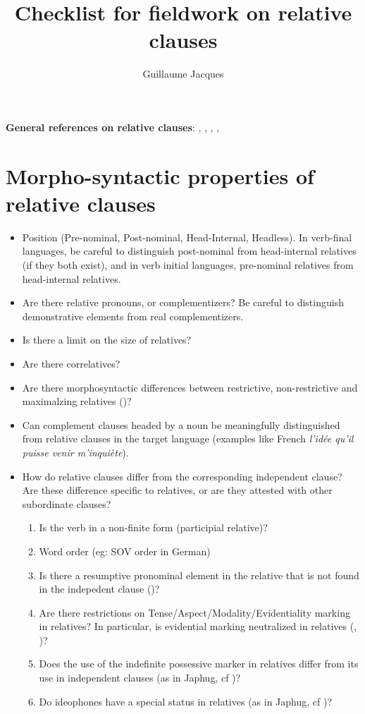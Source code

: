 \documentclass[oldfontcommands,oneside,a4paper,11pt]{article}
\begin{document}
 
\title{Checklist for fieldwork on relative clauses}
\author{Guillaume Jacques}
\maketitle

\textbf{General references on relative clauses}: \citet{comrie81relative}, \citet{lehmann86relatives}, \citet[205-250]{creissels06sgit2}, \citet{andrews07relatives}, \citet[313-369]{dixon10basic2}

\section{Morpho-syntactic properties of relative clauses}




\begin{itemize}
\item Position (Pre-nominal, Post-nominal, Head-Internal, Headless). In verb-final languages, be careful to distinguish post-nominal from head-internal relatives (if they both exist), and in verb initial languages, pre-nominal relatives from head-internal relatives.
\item Are there relative pronouns, or complementizers? Be careful to distinguish demonstrative elements from real complementizers.
\item Is there a limit on the size of relatives?
\item Are there correlatives?
\item Are there morphosyntactic differences between restrictive, non-restrictive and maximalzing relatives (\citealt{grosu98maximalizing})?
\item Can complement clauses headed by a noun be meaningfully distinguished from relative clauses in the target language (examples like French \textit{l'idée qu'il puisse venir m'inquiète}).
\item How do relative clauses differ from the corresponding independent clause? Are these difference specific to relatives, or are they attested with other subordinate clauses?
\begin{enumerate}
\item Is the verb in a non-finite form (participial relative)?
\item Word order (eg: SOV order in German)
\item Is there a resumptive pronominal element in the relative that is not found in the indepedent clause (\citealt{comrie81relative})?
\item Are there restrictions on Tense/Aspect/Modality/Evidentiality marking in relatives? In particular, is evidential marking neutralized in relatives (\citealt[253-6]{aikhenvald06}, \citealt{jacques16relatives})?
\item Does the use of the indefinite possessive marker  in relatives differ from its use in independent clauses (as in Japhug, cf \citealt{jacques16relatives})?
\item Do ideophones have a special status in relatives (as in Japhug, cf \citealt[275]{japhug14ideophones})?
\end{enumerate}
\end{itemize}
\end{document}
